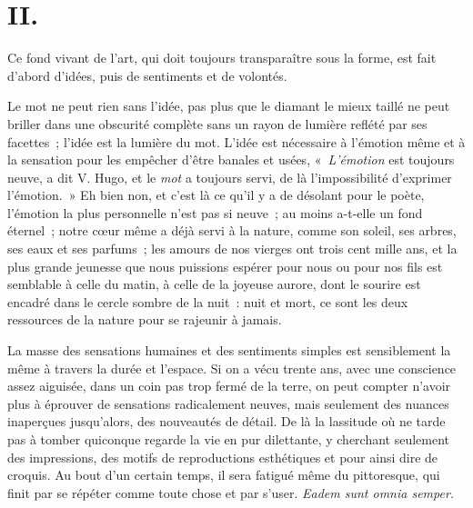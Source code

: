 \documentclass[french,twoside]{book} %
\begin{document}
\section[{II.}]{II.}
\noindent Ce fond vivant de l’art, qui doit toujours transparaître sous la forme, est fait d’abord d’idées, puis de sentiments et de volontés.\par
Le mot ne peut rien sans l’idée, pas plus que le diamant le mieux taillé ne peut briller dans une obscurité complète sans un rayon de lumière reflété par ses facettes ; l’idée est la lumière du mot. L’idée est nécessaire à l’émotion même et à la sensation pour les empêcher d’être banales et usées, « \emph{L’émotion} est toujours neuve, a dit V. Hugo, et le \emph{mot} a toujours servi, de là l’impossibilité d’exprimer l’émotion. » Eh bien non, et c’est là ce qu’il y a de désolant pour le poète, l’émotion la plus personnelle n’est pas si neuve ; au moins a-t-elle un fond éternel ; notre cœur même a déjà servi à la nature, comme son soleil, ses arbres, ses eaux et ses parfums ; les amours de nos vierges ont trois cent mille ans, et la plus grande jeunesse que nous puissions espérer pour nous ou pour nos fils est semblable à celle du matin, à celle de la joyeuse aurore, dont le sourire est encadré dans le cercle sombre de la nuit : nuit et mort, ce sont les deux ressources de la nature pour se rajeunir à jamais.\par
La masse des sensations humaines et des sentiments simples est sensiblement la même à travers la durée et l’espace. Si on a vécu trente ans, avec une conscience assez aiguisée, dans un coin pas trop fermé de la terre, on peut compter n’avoir plus à éprouver de sensations radicalement neuves, mais seulement des nuances inaperçues jusqu’alors, des nouveautés de détail. De là la lassitude où ne tarde pas à tomber quiconque regarde la vie en pur dilettante, y cherchant seulement des impressions, des motifs de reproductions esthétiques et pour ainsi dire de croquis. Au bout d’un certain temps, il sera fatigué même du pittoresque, qui finit par se répéter comme toute chose et par s’user. \emph{Eadem sunt omnia semper.}\par
\end{document}
